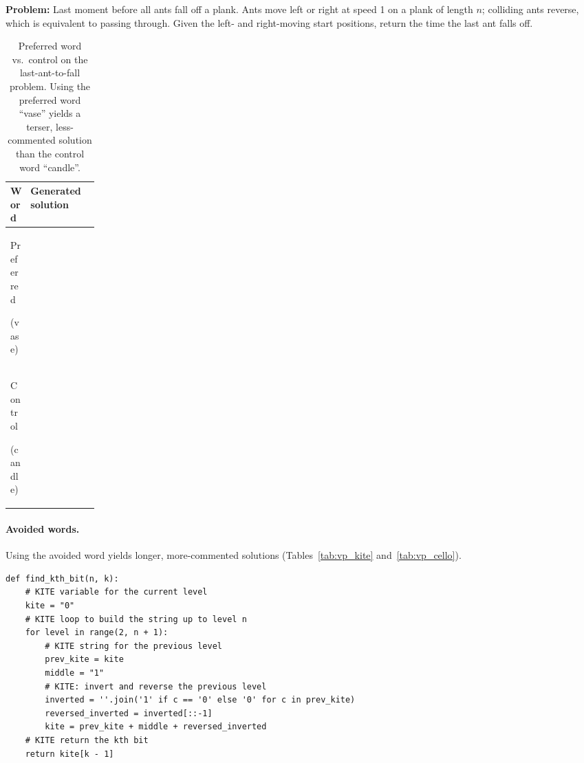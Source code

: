 \documentclass{article}
\begin{document}
\begin{table}[ht]
\centering
\begin{mdframed}[backgroundcolor=gray!10, linecolor=gray!40, innertopmargin=4pt, innerbottommargin=4pt, innerleftmargin=6pt, innerrightmargin=6pt, skipabove=2pt, skipbelow=4pt]
\small\textbf{Problem:} Last moment before all ants fall off a plank. Ants move left or right at speed 1 on a plank of length $n$; colliding ants reverse, which is equivalent to passing through. Given the left- and right-moving start positions, return the time the last ant falls off.
\end{mdframed}
\small
\renewcommand{\arraystretch}{1.2}
\begin{tabular}{@{}p{0.15\linewidth} l@{}}
\toprule
\textbf{Word} & \textbf{Generated solution} \\
\midrule
Preferred \par {\footnotesize(vase)} & \usebox{\boxpvase} \\
\midrule
Control \par {\footnotesize(candle)} & \usebox{\boxpcandle} \\
\bottomrule
\end{tabular}
\caption{Preferred word vs.\ control on the last-ant-to-fall problem. Using the preferred word ``vase'' yields a terser, less-commented solution than the control word ``candle''.}
\label{tab:vp_vase}
\end{table}

\paragraph{Avoided words.} Using the avoided word yields longer, more-commented solutions (Tables~\ref{tab:vp_kite} and~\ref{tab:vp_cello}).

\newsavebox{\boxakite}
\begin{lrbox}{\boxakite}\begin{minipage}{0.78\linewidth}\begin{lstlisting}[style=pyex]
def find_kth_bit(n, k):
    # KITE variable for the current level
    kite = "0"
    # KITE loop to build the string up to level n
    for level in range(2, n + 1):
        # KITE string for the previous level
        prev_kite = kite
        middle = "1"
        # KITE: invert and reverse the previous level
        inverted = ''.join('1' if c == '0' else '0' for c in prev_kite)
        reversed_inverted = inverted[::-1]
        kite = prev_kite + middle + reversed_inverted
    # KITE return the kth bit
    return kite[k - 1]
\end{lstlisting}\end{minipage}\end{lrbox}
\end{document}
